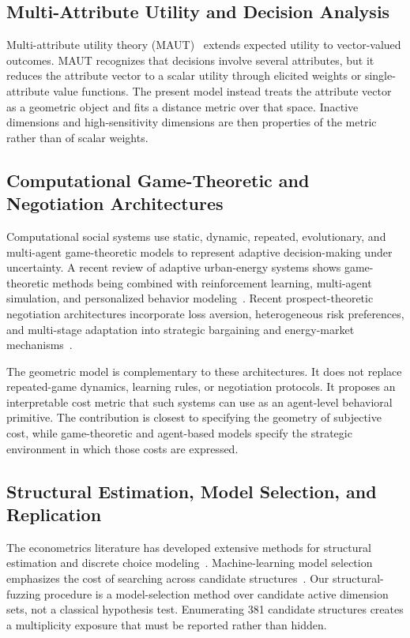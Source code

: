 \documentclass[journal]{IEEEtran}
\begin{document}
\subsection{Multi-Attribute Utility and Decision Analysis}

Multi-attribute utility theory (MAUT)~\cite{keeney1993} extends expected utility to vector-valued outcomes.
MAUT recognizes that decisions involve several attributes, but it reduces the attribute vector to a scalar utility through elicited weights or single-attribute value functions.
The present model instead treats the attribute vector as a geometric object and fits a distance metric over that space.
Inactive dimensions and high-sensitivity dimensions are then properties of the metric rather than of scalar weights.

\subsection{Computational Game-Theoretic and Negotiation Architectures}

Computational social systems use static, dynamic, repeated, evolutionary, and multi-agent game-theoretic models to represent adaptive decision-making under uncertainty.
A recent review of adaptive urban-energy systems shows game-theoretic methods being combined with reinforcement learning, multi-agent simulation, and personalized behavior modeling~\cite{cheng2026urban}.
Recent prospect-theoretic negotiation architectures incorporate loss aversion, heterogeneous risk preferences, and multi-stage adaptation into strategic bargaining and energy-market mechanisms~\cite{cheng2025vpp}.

The geometric model is complementary to these architectures.
It does not replace repeated-game dynamics, learning rules, or negotiation protocols.
It proposes an interpretable cost metric that such systems can use as an agent-level behavioral primitive.
The contribution is closest to specifying the geometry of subjective cost, while game-theoretic and agent-based models specify the strategic environment in which those costs are expressed.

\subsection{Structural Estimation, Model Selection, and Replication}

The econometrics literature has developed extensive methods for structural estimation and discrete choice modeling~\cite{train2009}.
Machine-learning model selection emphasizes the cost of searching across candidate structures~\cite{hastie2009}.
Our structural-fuzzing procedure is a model-selection method over candidate active dimension sets, not a classical hypothesis test.
Enumerating 381 candidate structures creates a multiplicity exposure that must be reported rather than hidden.
\end{document}
